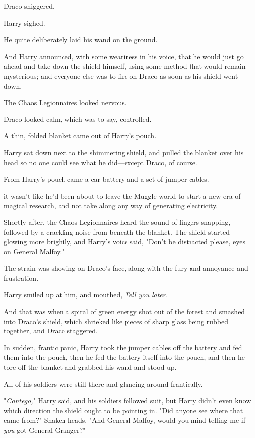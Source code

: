 Draco sniggered.

Harry sighed.

He quite deliberately laid his wand on the ground.

And Harry announced, with some weariness in his voice, that he would just go
ahead and take down the shield himself, using some method that would remain
mysterious; and everyone else was to fire on Draco as soon as his shield went
down.

The Chaos Legionnaires looked nervous.

Draco looked calm, which was to say, controlled.

A thin, folded blanket came out of Harry's pouch.

Harry sat down next to the shimmering shield, and pulled the blanket over his
head so no one could see what he did---except Draco, of course.

From Harry's pouch came a car battery and a set of jumper cables.

{\el} it wasn't like he'd been about to leave the Muggle world to start a new
era of magical research, and not take along any way of generating electricity.

Shortly after, the Chaos Legionnaires heard the sound of fingers snapping,
followed by a crackling noise from beneath the blanket. The shield started
glowing more brightly, and Harry's voice said, "Don't be distracted please,
eyes on General Malfoy."

The strain was showing on Draco's face, along with the fury and annoyance and
frustration.

Harry smiled up at him, and mouthed, \emph{Tell you later.}

And that was when a spiral of green energy shot out of the forest and smashed
into Draco's shield, which shrieked like pieces of sharp glass being rubbed
together, and Draco staggered.

In sudden, frantic panic, Harry took the jumper cables off the battery and fed
them into the pouch, then he fed the battery itself into the pouch, and then he
tore off the blanket and grabbed his wand and stood up.

All of his soldiers were still there and glancing around frantically.

"\emph{Contego,}" Harry said, and his soldiers followed suit, but Harry didn't
even know which direction the shield ought to be pointing in. "Did anyone see
where that came from?" Shaken heads. "And General Malfoy, would you mind
telling me if \emph{you} got General Granger?"

